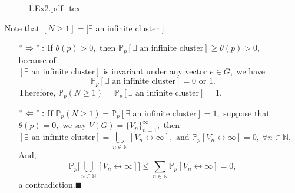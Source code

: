 \documentclass[12pt,a4paper]{report}
\theoremstyle{definition}
\newcommand{\SOL}{\fbox{ \tt s\parbox[b][2pt][c]{6pt}{o}\hspace*{-7pt} L:}}
\newcommand{\incfig}[1]{%
{#1.pdf_tex}
}
\begin{document}
\begin{enumerate}
\begin{figure}[htp]
	\centering
	\def\svgwidth{8cm}
	\incfig{1.Ex2}
	\end{figure}
	\item[\SOL] Note that $[N\geq 1]=[\exists$ an infinite cluster $].$
	\begin{enumerate}
	    \item[$``\Rightarrow":$] If $\theta(p)>0,$ then $\mathbb{P}_p[\exists\mbox{ an infinite cluster}]\geq\theta(p)>0,$ because of\\ $[\exists\mbox{ an infinite cluster}]$ is invariant under any vector $e\in G,$ we have
	    \[
	   \mathbb{P}_p[\exists\mbox{ an infinite cluster}]=0\mbox{ or }1.
	    \]
	    Therefore, $\mathbb{P}_p(N\geq 1)=\mathbb{P}_p[\exists\mbox{ an infinite cluster}]=1.$
	    \item[$``\Leftarrow":$] If $\mathbb{P}_p(N\geq 1)=\mathbb{P}_p[\exists\mbox{ an infinite cluster}]=1,$ suppose that $\theta(p)=0,$ we say $V(G)=\{V_n\}_{n=1}^\infty,$ then
	    \[
	    [\exists\mbox{ an infinite cluster}]=\bigcup_{n\in\mathbb{N}}[V_n\leftrightarrow\infty],\mbox{ and } \mathbb{P}_p[V_n\leftrightarrow\infty]=0,\ \forall n\in\mathbb{N}.
	    \]
	    And,
	    \[
	    \mathbb{P}_p\Big[\bigcup_{n\in\mathbb{N}}[V_n\leftrightarrow\infty]\Big]\leq \sum_{n\in\mathbb{N}}\mathbb{P}_p[V_n\leftrightarrow\infty]=0,
	    \]
	    a contradiction.\qquad $\blacksquare$
	\end{enumerate}
\end{enumerate}
\newpage
\end{document}
